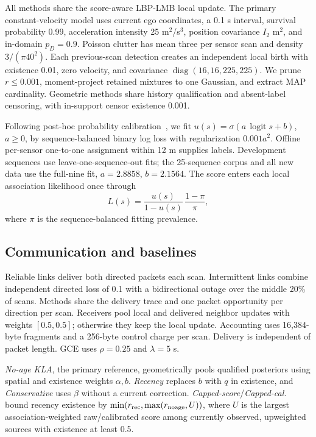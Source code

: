 All methods share the score-aware LBP-LMB local update. The primary
constant-velocity model uses current ego coordinates, a 0.1 s interval,
survival probability 0.99, acceleration intensity 25 m$^2$/s$^3$,
position covariance $I_2$ m$^2$, and in-domain $p_D=0.9$.
Poisson clutter has mean three per sensor scan and density $3/(\pi40^2)$.
Each previous-scan detection creates an independent local birth with
existence 0.01, zero velocity, and covariance
$\operatorname{diag}(16,16,225,225)$. We prune $r\leq0.001$, moment-project
retained mixtures to one Gaussian, and extract MAP cardinality.
Geometric methods share history qualification and absent-label
censoring, with in-support censor existence 0.001.

Following post-hoc probability calibration~\cite{niculescu2005calibration},
we fit $u(s)=\sigma(a\,\operatorname{logit}s+b)$, $a\geq0$, by
sequence-balanced binary log loss with regularization $0.001a^2$.
Offline per-sensor one-to-one assignment within 12 m supplies labels.
Development sequences use leave-one-sequence-out fits; the 25-sequence
corpus and all new data use the full-nine fit, $a=2.8858$, $b=2.1564$.
The score enters each local association likelihood once through
\begin{equation}
 L(s)=\frac{u(s)}{1-u(s)}\,\frac{1-\pi}{\pi},
 \label{eq:mark}
\end{equation}
where $\pi$ is the sequence-balanced fitting prevalence.

\subsection{Communication and baselines}
Reliable links deliver both directed packets each scan. Intermittent
links combine independent directed loss of 0.1 with a bidirectional
outage over the middle 20\% of scans. Methods share the delivery trace
and one packet opportunity per direction per scan. Receivers pool local
and delivered neighbor updates with weights $[0.5,0.5]$; otherwise they
keep the local update. Accounting uses 16,384-byte fragments and a
256-byte control charge per scan. Delivery is independent of packet
length. GCE uses $\rho=0.25$ and $\lambda=5$ s.

\emph{No-age KLA}, the primary reference, geometrically pools qualified
posteriors using spatial and existence weights $\alpha,b$.
\emph{Recency} replaces $b$ with $q$ in existence, and
\emph{Conservative} uses $\beta$ without a current correction.
\emph{Capped-score}/\emph{Capped-cal.} bound recency existence by
$\min(r_{\rm rec},\max(r_{\rm noage},U))$, where $U$ is the largest
association-weighted raw/calibrated score among currently observed,
upweighted sources with existence at least 0.5.

